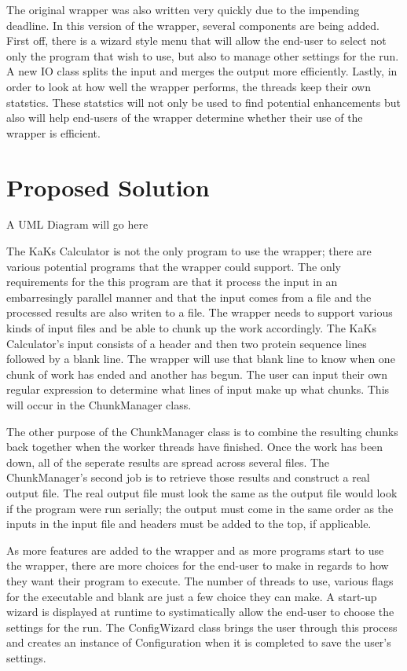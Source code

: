 \documentclass[12pt]{article}
\begin{document}

The original wrapper was also written very quickly due to the impending
deadline. In this version of the wrapper, several components are being added.
First off, there is a wizard style menu that will allow the end-user to select
not only the program that wish to use, but also to manage other settings for the
run. A new IO class splits the input and merges the output more 
efficiently. Lastly, in order to look at how well the wrapper performs, 
the threads keep their own statstics. These statstics will not only be used to 
find potential enhancements but also will help end-users of the wrapper
determine whether their use of the wrapper is efficient.

\section{Proposed Solution}

A UML Diagram will go here

The KaKs Calculator is not the only program to use the wrapper; there are
various potential programs that the wrapper could support. The only requirements
for the this program are that it process the input in an embarresingly parallel
manner and that the input comes from a file and the processed results are also
writen to a file. The wrapper needs to support various kinds of input files and 
be able to chunk up the work accordingly. The KaKs Calculator's input consists 
of a header and then two protein sequence lines followed by a blank line. The 
wrapper will use that blank line to know when one chunk of work has ended and 
another has begun. The user can input their own regular expression to determine 
what lines of input make up what chunks. This will occur in the ChunkManager 
class. 

The other purpose of the ChunkManager class is to combine the resulting chunks 
back together when the worker threads have finished. Once the work has been
down, all of the seperate results are spread across several files. The
ChunkManager's second job is to retrieve those results and construct a real
output file. The real output file must look the same as the output file would
look if the program were run serially; the output must come in the same order as
the inputs in the input file and headers must be added to the top, if
applicable.

As more features are added to the wrapper and as more programs start to use the
wrapper, there are more choices for the end-user to make in regards to how they
want their program to execute. The number of threads to use, various flags for
the executable and blank are just a few choice they can make. A start-up wizard
is displayed at runtime to systimatically allow the end-user to choose the
settings for the run. The ConfigWizard class brings the user through this
process and creates an instance of Configuration when it is completed to save
the user's settings.
\end{document}
